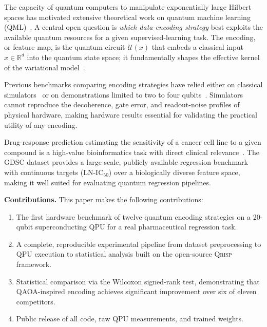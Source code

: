 \documentclass[twocolumn,aps,pra,superscriptaddress,floatfix]{revtex4-2}
\newcommand{\qrisp}{\textsc{Qrisp}}
\begin{document}
The capacity of quantum computers to manipulate exponentially large Hilbert
spaces has motivated extensive theoretical work on quantum machine learning
(QML)~\cite{biamonte2017,schuld2021,cerezo2021}.
A central open question is \emph{which data-encoding strategy} best exploits the
available quantum resources for a given supervised-learning task.
The encoding, or feature map, is the quantum circuit $\mathcal{U}(x)$ that
embeds a classical input $x\in\mathbb{R}^d$ into the quantum state space;
it fundamentally shapes the effective kernel of the variational
model~\cite{schuld2021kernel,havlicek2019}.

Previous benchmarks comparing encoding strategies have relied either on
classical simulators~\cite{perezSalinas2020,lloyd2020,killoran2019} or
on demonstrations limited to two to four
qubits~\cite{havlicek2019,mitarai2018}.
Simulators cannot reproduce the decoherence, gate error, and readout-noise
profiles of physical hardware, making hardware results essential for validating
the practical utility of any encoding.

Drug-response prediction estimating the sensitivity of a cancer cell line to
a given compound is a high-value bioinformatics task with direct clinical
relevance~\cite{iorio2016}.
The GDSC dataset provides a large-scale, publicly available regression benchmark
with continuous targets (LN-IC$_{50}$) over a biologically diverse feature
space, making it well suited for evaluating quantum regression pipelines.

\textbf{Contributions.}  This paper makes the following contributions:
\begin{enumerate}
  \item The first hardware benchmark of twelve quantum encoding strategies on a
        20-qubit superconducting QPU for a real pharmaceutical regression task.
  \item A complete, reproducible experimental pipeline from dataset
        preprocessing to QPU execution to statistical analysis built on the
        open-source \qrisp{} framework.
  \item Statistical comparison via the Wilcoxon signed-rank test,
        demonstrating that QAOA-inspired encoding achieves significant
        improvement over six of eleven competitors.
  \item Public release of all code, raw QPU measurements, and trained weights.
\end{enumerate}

\end{document}
